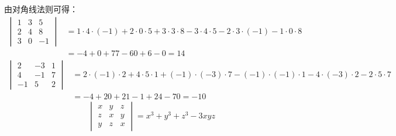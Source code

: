 \begin{solution}
由对角线法则可得：
\[\begin{split}
    \begin{vmatrix}
        1&3&5\\2&4&8\\3&0&-1
    \end{vmatrix}&=1\cdot 4\cdot (-1)+2\cdot 0\cdot 5+3\cdot 3\cdot8-3\cdot4\cdot5-2\cdot 3\cdot (-1)-1\cdot 0\cdot 8\\
    &=-4+0+77-60+6-0=14
\end{split}\]
\[\begin{split}
    \begin{vmatrix}
        2&-3&1\\4&-1&7\\-1&5&2
    \end{vmatrix}&=2\cdot(-1)\cdot2+4\cdot5\cdot1+(-1)\cdot(-3)\cdot7-(-1)\cdot(-1)\cdot1-4\cdot(-3)\cdot2-2\cdot5\cdot7\\
    &=-4+20+21-1+24-70=-10
\end{split}\]
\[\begin{vmatrix}
    x&y&z\\z&x&y\\y&z&x
\end{vmatrix}=x^3+y^3+z^3-3xyz\]
\end{solution}

